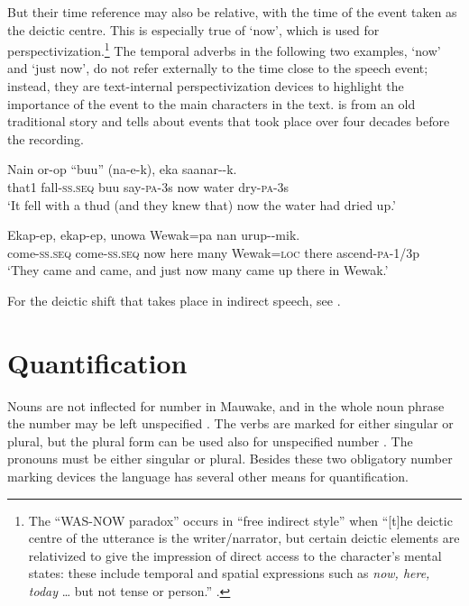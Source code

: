 But their time reference may also be relative, with the time of the event taken as the deictic centre. This is especially true of  `now', which is used for perspectivization.\footnote{The ``WAS-NOW paradox'' occurs in ``free indirect style'' when ``[t]he deictic centre of the utterance is the writer/narrator, but certain deictic elements are relativized to give the impression of direct access to the character's mental states: these include temporal and spatial expressions such as \textit{now, here, today} {\dots} but not tense or person.'' \citep{MushinEtAl2000}.} The temporal adverbs in the following two examples,  `now' and  `just now', do not refer externally to the time close to the speech event; instead, they are text-internal perspectivization devices to highlight the importance of the event to the main characters in the text.  is from an old traditional story and  tells about events that took place over four decades before the recording. 

\ea%
\label{ex:x475}
\gll Nain  or-op  ``buu''  (na-e-k),    eka  saanar--k. \\
that1  fall-\textsc{ss}.\textsc{seq}  buu  say-\textsc{pa}-3s  now  water  dry-\textsc{pa}-3s\\
\glt `It fell with a thud (and they knew that) now the water had dried up.'
\z

\ea%
\label{ex:x1891}
\gll Ekap-ep,  ekap-ep,     unowa  Wewak=pa nan  urup--mik.\\
come-\textsc{ss}.\textsc{seq}  come-\textsc{ss}.\textsc{seq}  now  here  many  Wewak=\textsc{loc} there  ascend-\textsc{pa}-1/3p \\
\glt `They came and came, and just now many came up there in Wewak.'
\z

For the deictic shift that takes place in indirect speech, see .

\section{Quantification}
{}
Nouns are not inflected for number in Mauwake, and in the whole noun phrase the number may be left unspecified . The verbs are marked for either singular or plural, but the plural form can be used also for unspecified number . The pronouns must be either singular or plural. Besides these two obligatory number marking devices the language has several other means for quantification.

